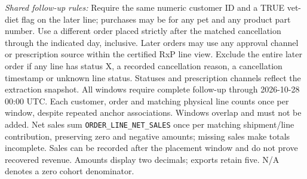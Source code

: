 \begin{table}[!htbp]
\begin{minipage}{\linewidth}
\textit{Shared follow-up rules:} Require the same numeric customer ID and a TRUE vet-diet flag on the later line; purchases may be for any pet and any product part number. Use a different order
placed strictly after the matched cancellation through the indicated day, inclusive.
Later orders may use any approval channel or prescription source within the certified RxP line view.
Exclude the entire later order if any line has status X, a recorded cancellation reason,
a cancellation timestamp or unknown line status. Statuses and prescription channels reflect
the extraction snapshot. All windows require complete follow-up through 2026-10-28 00:00 UTC.
Each customer, order and matching physical line counts once per window, despite repeated
anchor associations. Windows overlap and must not be added. Net sales sum \texttt{ORDER\_LINE\_NET\_SALES} once per matching shipment/line contribution, preserving zero and negative amounts; missing sales make totals incomplete.
Sales can be recorded after the placement window and do not prove recovered revenue.
Amounts display two decimals; exports retain five. N/A denotes a zero cohort denominator.
\end{minipage}
\end{table}
